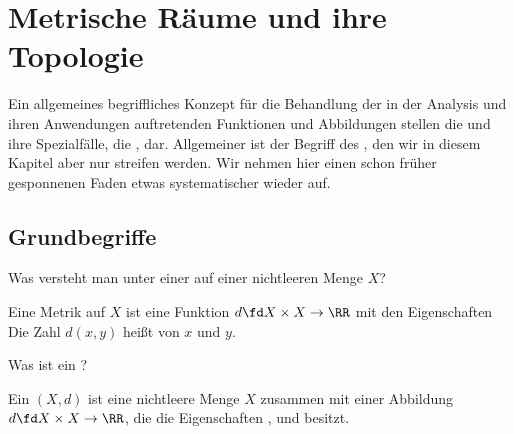 
\chapter{Metrische R\"aume und ihre Topologie}

Ein allgemeines begriffliches Konzept für die Behandlung der in der 
Analysis und ihren Anwendungen auftretenden Funktionen und Abbildungen 
stellen die  und ihre Spezialfälle, 
die , dar. 
Allgemeiner ist der Begriff des , 
den wir in diesem Kapitel aber nur streifen werden. Wir nehmen 
hier einen schon früher gesponnenen Faden etwas systematischer wieder auf. 

\section{Grundbegriffe}

\begin{frage}
  Was versteht man unter einer  auf einer 
  nichtleeren Menge $X$?
\end{frage}

\begin{antwort}
  Eine Metrik auf $X$ ist eine Funktion 
  $d\fd X\times X \to \RR$ mit den Eigenschaften 
  {\setlength{\labelsep}{7mm}
     }
  Die Zahl $d(x,y)$ heißt  von $x$ und $y$. \AntEnd
  
\end{antwort}

\begin{frage}
  Was ist ein ?
\end{frage}

\begin{antwort}
  Ein  $(X,d)$ ist eine nichtleere Menge 
  $X$ zusammen mit einer Abbildung 
  $d\fd X\times X \to \RR$, die die Eigenschaften ,  
  und  besitzt.
  \AntEnd
\end{antwort}

